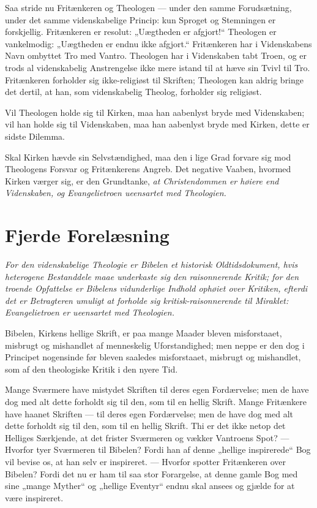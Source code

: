 \documentclass[12pt,a4paper]{book}
\newcommand{\opage}[1]{\marginnote{\footnotesize\textit{[#1]}}}
\begin{document}
Saa stride nu Fritænkeren og Theologen --- under den samme
Forudsætning, under det samme videnskabelige Princip: kun Sproget og
Stemningen er forskjellig. Fritænkeren er resolut: „Uægtheden er
afgjort!“ Theologen er vankelmodig: „Uægtheden er endnu ikke
afgjort.“ Fritænkeren har i Videnskabens Navn ombyttet Tro med
Vantro. Theologen har i Videnskaben tabt Troen, og er trods al
videnskabelig Anstrengelse ikke mere istand til at hæve sin Tvivl til
Tro. Fritænkeren forholder sig
\opage{37} ikke-religiøst til Skriften; Theologen kan aldrig bringe det dertil,
at han, som videnskabelig Theolog, forholder sig religiøst.

Vil Theologen holde sig til Kirken, maa han aabenlyst bryde med
Videnskaben; vil han holde sig til Videnskaben, maa han aabenlyst
bryde med Kirken, dette er sidste Dilemma.

Skal Kirken hævde sin Selvstændighed, maa den i lige Grad forvare sig
mod Theologens Forsvar og Fritænkerens Angreb. Det negative Vaaben,
hvormed Kirken værger sig, er den Grundtanke, \emph{at Christendommen
er høiere end Videnskaben, og Evangelietroen ueensartet med
Theologien.}

\chapter*{Fjerde Forelæsning}
\label{ch:forel4}

\begin{center}\itshape
For den videnskabelige Theologie er Bibelen et historisk Oldtidsdokument,
hvis heterogene Bestanddele maae underkaste sig den raisonnerende Kritik;
for den troende Opfattelse er Bibelens vidunderlige Indhold ophøiet over
Kritiken, efterdi det er Betragteren umuligt at forholde sig
kritisk-raisonnerende til Miraklet: Evangelietroen er ueensartet med
Theologien.
\end{center}

\opage{38} Bibelen, Kirkens hellige Skrift, er paa mange Maader bleven misforstaaet,
misbrugt og mishandlet af menneskelig Uforstandighed; men neppe er den dog i
Principet nogensinde før bleven saaledes misforstaaet, misbrugt og mishandlet,
som af den theologiske Kritik i den nyere Tid.

Mange Sværmere have mistydet Skriften til deres egen Fordærvelse; men de have
dog med alt dette forholdt sig til den, som til en hellig Skrift. Mange
Fritænkere have haanet Skriften --- til deres egen Fordærvelse; men de have dog
med alt dette forholdt sig til den, som til en hellig Skrift. Thi er det ikke
netop det Helliges Særkjende, at det frister Sværmeren og vækker Vantroens
Spot? --- Hvorfor tyer Sværmeren til Bibelen? Fordi han af denne „hellige
inspirerede“ Bog vil bevise os, at han selv er inspireret. --- Hvorfor spotter
Fritænkeren over Bibelen? Fordi det nu er ham til saa stor Forargelse, at denne
gamle Bog med sine „mange Myther“ og „hellige Eventyr“ endnu skal ansees og
gjælde for at være inspireret.
\end{document}
